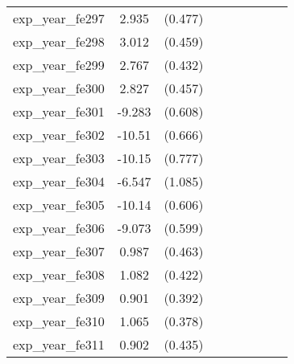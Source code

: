 {\begin{tabular}{l*{4}{cc}}
exp\_year\_fe297&    2.935\sym{***}&  (0.477)&                  &         &                  &         &                  &         \\
exp\_year\_fe298&    3.012\sym{***}&  (0.459)&                  &         &                  &         &                  &         \\
exp\_year\_fe299&    2.767\sym{***}&  (0.432)&                  &         &                  &         &                  &         \\
exp\_year\_fe300&    2.827\sym{***}&  (0.457)&                  &         &                  &         &                  &         \\
exp\_year\_fe301&   -9.283\sym{***}&  (0.608)&                  &         &                  &         &                  &         \\
exp\_year\_fe302&   -10.51\sym{***}&  (0.666)&                  &         &                  &         &                  &         \\
exp\_year\_fe303&   -10.15\sym{***}&  (0.777)&                  &         &                  &         &                  &         \\
exp\_year\_fe304&   -6.547\sym{***}&  (1.085)&                  &         &                  &         &                  &         \\
exp\_year\_fe305&   -10.14\sym{***}&  (0.606)&                  &         &                  &         &                  &         \\
exp\_year\_fe306&   -9.073\sym{***}&  (0.599)&                  &         &                  &         &                  &         \\
exp\_year\_fe307&    0.987\sym{*}  &  (0.463)&                  &         &                  &         &                  &         \\
exp\_year\_fe308&    1.082\sym{*}  &  (0.422)&                  &         &                  &         &                  &         \\
exp\_year\_fe309&    0.901\sym{*}  &  (0.392)&                  &         &                  &         &                  &         \\
exp\_year\_fe310&    1.065\sym{**} &  (0.378)&                  &         &                  &         &                  &         \\
exp\_year\_fe311&    0.902\sym{*}  &  (0.435)&                  &         &                  &         &                  &         \\

\end{tabular}}
